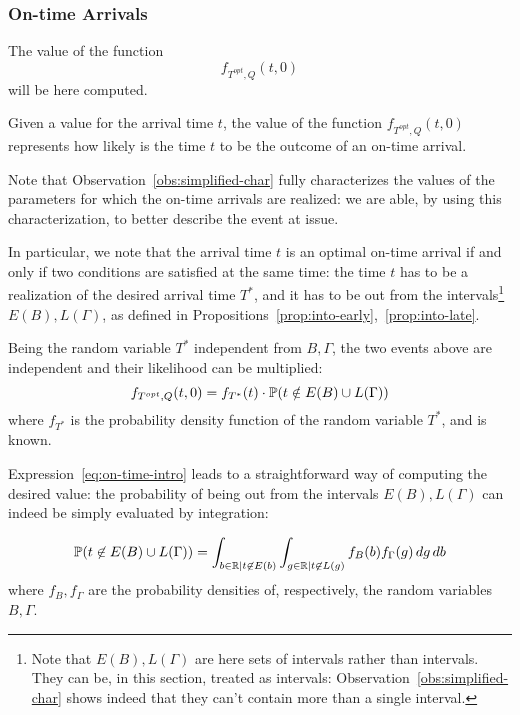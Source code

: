 \subsubsection{On-time Arrivals}

The value of the function
\begin{equation*}
  f_{T^{opt}, Q}(t, 0)
\end{equation*}
will be here computed.

Given a value for the arrival time \(t\),
the value of the function \(f_{T^{opt}, Q}(t, 0)\) represents how likely is the time \(t\) to be the outcome of an on-time arrival.

Note that Observation~\ref{obs:simplified-char} fully characterizes the values of the parameters for which the on-time arrivals are realized:
we are able, by using this characterization, to better describe the event at issue.

In particular, we note that the arrival time \(t\) is an optimal on-time arrival if and only if two conditions are satisfied at the same time:
the time \(t\) has to be a realization of the desired arrival time \(T^*\),
and it has to  be out from the intervals\footnote{
  Note that \(E(B), L(\Gamma)\) are here sets of intervals rather than intervals.
  They can be, in this section, treated as intervals:
  Observation~\ref{obs:simplified-char} shows indeed that they can't contain more than a single interval.
}
\(E(B), L(\Gamma)\),
as defined in Propositions~\ref{prop:into-early},~\ref{prop:into-late}.

Being the random variable \(T^*\) independent from \(B, \Gamma\),
the two events above are independent and their likelihood can be multiplied:
\begin{equation}
  \label{eq:on-time-intro}
  f_{T^{opt}, Q}(t, 0) = f_{T^*}(t) \cdot \mathbb{P}(t \notin E(B) \cup L(\Gamma))
\end{equation}
where \(f_{T^*}\) is the probability density function of the random variable \(T^*\), and is known.

Expression~\eqref{eq:on-time-intro} leads to a straightforward way of computing the desired value:
the probability of being out from the intervals \(E(B), L(\Gamma)\) can indeed be simply evaluated by integration:

\begin{equation}
  \label{eq:prob-not-intervals}
  \mathbb{P}( t \not\in E(B) \cup L(\Gamma)) = \int_{b\in \mathbb{R} \vert t \not\in E(b)}\int_{g \in \mathbb{R} \vert t \not\in L(g)}f_B(b)f_\Gamma(g)\, dg\, db
\end{equation}
where \(f_B, f_\Gamma\) are the probability densities of, respectively, the random variables \(B, \Gamma\).


